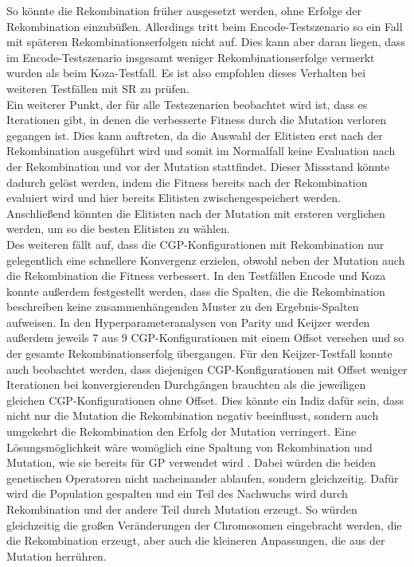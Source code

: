 So könnte die Rekombination früher ausgesetzt werden, ohne Erfolge der Rekombination einzubüßen.
Allerdings tritt beim Encode-Testszenario so ein Fall mit späteren Rekombinationserfolgen nicht auf.
Dies kann aber daran liegen, dass im Encode-Testszenario insgesamt weniger Rekombinationserfolge vermerkt wurden als beim Koza-Testfall.
Es ist also empfohlen dieses Verhalten bei weiteren Testfällen mit SR zu prüfen.\\
Ein weiterer Punkt, der für alle Testszenarien beobachtet wird ist, dass es Iterationen gibt, in denen die verbesserte Fitness durch die Mutation verloren gegangen ist.
Dies kann auftreten, da die Auswahl der Elitisten erst nach der Rekombination ausgeführt wird und somit im Normalfall keine Evaluation nach der Rekombination und vor der Mutation stattfindet.
Dieser Missstand könnte dadurch gelöst werden, indem die Fitness bereits nach der Rekombination evaluiert wird und hier bereits Elitisten zwischengespeichert werden.
Anschließend könnten die Elitisten nach der Mutation mit ersteren verglichen werden, um so die besten Elitisten zu wählen.\\
Des weiteren fällt auf, dass die CGP-Konfigurationen mit Rekombination nur gelegentlich eine schnellere Konvergenz erzielen, obwohl neben der Mutation auch die Rekombination die Fitness verbessert.
In den Testfällen Encode und Koza konnte außerdem festgestellt werden, dass die Spalten, die die Rekombination beschreiben keine zusammenhängenden Muster zu den Ergebnis-Spalten aufweisen.
In den Hyperparameteranalysen von Parity und Keijzer werden außerdem jeweils 7 aus 9 CGP-Konfigurationen mit einem Offset versehen und so der gesamte Rekombinationserfolg übergangen.
Für den Keijzer-Testfall konnte auch beobachtet werden, dass diejenigen CGP-Konfigurationen mit Offset weniger Iterationen bei konvergierenden Durchgängen brauchten als die jeweiligen gleichen CGP-Konfigurationen ohne Offset.
Dies könnte ein Indiz dafür sein, dass nicht nur die Mutation die Rekombination negativ beeinflusst, sondern auch umgekehrt die Rekombination den Erfolg der Mutation verringert.
Eine Lösungsmöglichkeit wäre womöglich eine Spaltung von Rekombination und Mutation, wie sie bereits für GP verwendet wird \cite{eiben_introduction_2015}.
Dabei würden die beiden genetischen Operatoren nicht nacheinander ablaufen, sondern gleichzeitig.
Dafür wird die Population gespalten und ein Teil des Nachwuchs wird durch Rekombination und der andere Teil durch Mutation erzeugt.
So würden gleichzeitig die großen Veränderungen der Chromosomen eingebracht werden, die die Rekombination erzeugt, aber auch die kleineren Anpassungen, die aus der Mutation herrühren.
